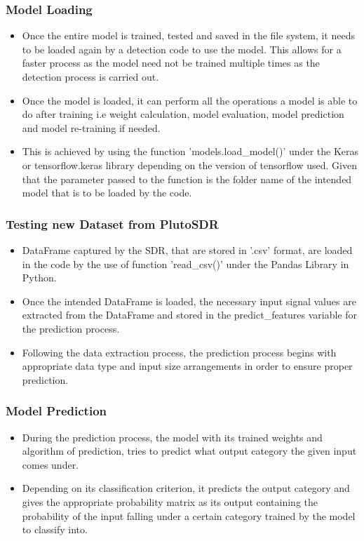   \subsubsection*{Model Loading}
    \begin{itemize}
      \item Once the entire model is trained, tested and saved in the file system, it needs to be loaded again by a detection code to use the model. This allows for a faster process as the model need not be trained multiple times as the detection process is carried out.
      \item Once the model is loaded, it can perform all the operations a model is able to do after training i.e weight calculation, model evaluation, model prediction and model re-training if needed.
      \item This is achieved by using the function 'models.load\_model()' under the Keras or tensorflow.keras library depending on the version of tensorflow used. Given that the parameter passed to the function is the folder name of the intended model that is to be loaded by the code.
    \end{itemize}

  \subsubsection*{Testing new Dataset from PlutoSDR}
    \begin{itemize}
      \item DataFrame captured by the SDR, that are stored in '.csv' format, are loaded in the code by the use of function 'read\_csv()' under the Pandas Library in Python.
      \item Once the intended DataFrame is loaded, the necessary input signal values are extracted from the DataFrame and stored in the predict\_features variable for the prediction process.
      \item Following the data extraction process, the prediction process begins with appropriate data type and input size arrangements in order to ensure proper prediction.
    \end{itemize}

  \subsubsection*{Model Prediction }
    \begin{itemize}
      \item During the prediction process, the model with its trained weights and algorithm of prediction, tries to predict what output category the given input comes under.
      \item Depending on its classification criterion, it predicts the output category and gives the appropriate probability matrix as its output containing the probability of the input falling under a certain category trained by the model to classify into.
    \end{itemize}


